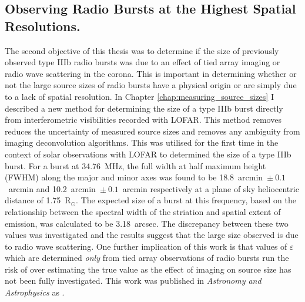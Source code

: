\subsection{Observing Radio Bursts at the Highest Spatial Resolutions.}
The second objective of this thesis was to determine if the size of previously observed type IIIb radio bursts was due to an effect of tied array imaging or radio wave scattering in the corona. 
This is important in determining whether or not the large source sizes of radio bursts have a physical origin or are simply due to a lack of spatial resolution. 
In Chapter \ref{chap:measuring_source_sizes} I described a new method for determining the size of a type IIIb burst directly from interferometric visibilities recorded with LOFAR. This method removes reduces the uncertainty of measured source sizes and removes any ambiguity from imaging deconvolution algorithms.
This was utilised for the first time in the context of solar observations with LOFAR to determined the size of a type IIIb burst. For a burst at 34.76~MHz, the full width at half maximum height (FWHM) along the major and minor axes was found to be 18.8~arcmin~$\pm~0.1$~arcmin and 10.2~arcmin~$\pm~0.1$~arcmin respectively at a plane of sky heliocentric distance of 1.75~R$_\odot$. The expected size of a burst at this frequency, based on the relationship between the spectral width of the striation and spatial extent of emission, was calculated to be 3.18~arcsec. The discrepancy between these two values was investigated and the results suggest that the large size observed is due to radio wave scattering. One further implication of this work is that values of $\varepsilon$ which are determined \textit{only} from tied array observations of radio bursts run the risk of over estimating the true value as the effect of imaging on source size has not been fully investigated. This work was published in \textit{Astronomy and Astrophysics} as \cite{Murphy2021}.

